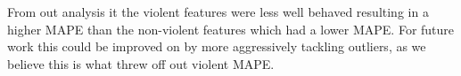 \documentclass{article}
\begin{document}
From out analysis it the violent features were less well behaved resulting in a higher MAPE than the non-violent features which had a lower MAPE. For future work this could be improved on by more aggressively tackling outliers, as we believe this is what threw off out violent MAPE.  

\printbibliography
\end{document}
